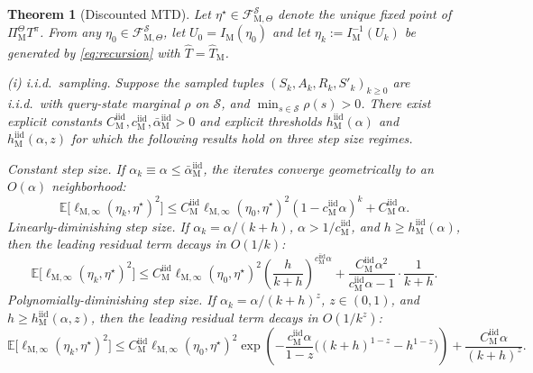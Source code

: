 \documentclass{article}
\newtheorem{theorem}{Theorem}
\newcommand{\X}{\mathcal{S}}
\newcommand{\E}{\mathbb{E}}
\begin{document}
\begin{theorem}[Discounted MTD]\label{thm:mtd-main}
Let $\eta^\star \in \mathcal F_{\mathrm M,\Theta}^{\X}$ denote the unique fixed point of $\Pi_{\mathrm M}^{\Theta} T^\pi$. From any $\eta_0\in\mathcal F_{\mathrm M,\Theta}^{\X}$, let $U_0=I_{\mathrm M}(\eta_0)$ and let $\eta_k := I_{\mathrm M}^{-1}(U_k)$ be generated by \eqref{eq:recursion} with $\widehat T=\widehat T_{\mathrm M}$.

\textup{(i) i.i.d.\ sampling.} Suppose the sampled tuples $(S_k,A_k,R_k,S'_k)_{k\ge 0}$ are i.i.d.\ with query-state marginal $\rho$ on $\X$, and $\min_{s \in \X}\rho(s) > 0$. There exist explicit constants $C^{\mathrm{iid}}_\mathrm M, c^{\mathrm{iid}}_\mathrm M, \bar \alpha^{\mathrm{iid}}_\mathrm M >0$ and explicit thresholds $h^{\mathrm{iid}}_\mathrm M(\alpha)$ and $h^{\mathrm{iid}}_\mathrm M(\alpha, z)$ for which the following results hold on three step size regimes.

\textup{Constant step size.} If $\alpha_k \equiv \alpha \le \bar \alpha ^{\mathrm{iid}}_\mathrm M$, the iterates converge geometrically to an $O(\alpha)$ neighborhood:
\begin{equation}
\E\bigl[\ell_{\mathrm M, \infty}(\eta_k, \eta^\star)^2 \bigr] \le C^{\mathrm{iid}}_\mathrm M \ell_{\mathrm M, \infty}(\eta_0, \eta^\star)^2(1- c^{\mathrm{iid}}_\mathrm M\alpha)^k + C^{\mathrm{iid}}_\mathrm M \alpha.
\end{equation}
\textup{Linearly-diminishing step size.} If $\alpha_k = \alpha / (k+h)$, $\alpha > 1/c^{\mathrm{iid}}_\mathrm M$, and $h \ge h^{\mathrm{iid}}_\mathrm M(\alpha)$, then the leading residual term decays in $O(1/k)$:
\begin{equation}
\E\bigl[\ell_{\mathrm M, \infty}(\eta_k, \eta^\star)^2 \bigr] \le C^{\mathrm{iid}}_\mathrm M \ell_{\mathrm M, \infty}(\eta_0, \eta^\star)^2\left(\frac{h}{k+h} \right)^{c^{\mathrm{iid}}_\mathrm M \alpha} + \frac{C^{\mathrm{iid}}_\mathrm M \alpha^2}{c^{\mathrm{iid}}_\mathrm M\alpha -1} \cdot \frac{1}{k+h}.
\end{equation}
\textup{Polynomially-diminishing step size.} If $\alpha_k = \alpha/(k+h)^z$, $z \in (0,1)$, and $h \ge h^{\mathrm{iid}}_\mathrm M(\alpha, z)$, then the leading residual term decays in $O(1/k^z)$:
\begin{equation}
\E\bigl[\ell_{\mathrm M, \infty}(\eta_k, \eta^\star)^2 \bigr] \le C^{\mathrm{iid}}_\mathrm M \ell_{\mathrm M, \infty}(\eta_0, \eta^\star)^2\exp\left(-\frac{c^{\mathrm{iid}}_\mathrm M \alpha}{1-z} \bigl((k+h)^{1-z} - h^{1-z} \bigr) \right) + \frac{C^{\mathrm{iid}}_\mathrm M \alpha}{(k+h)^z}.
\end{equation}


\end{theorem}
\end{document}
